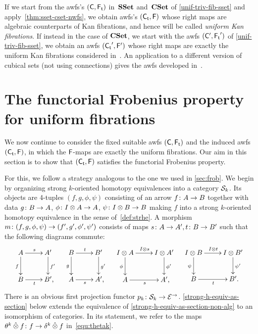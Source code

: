 \documentclass[reqno,10pt,a4paper,oneside,draft]{amsart}
\begin{document}
{{\begin{example} \label{unif-fib-sset}
If we start from the awfs's $(\CC, \TF)$ in~$\SSet$ and~$\CSet$ of \cref{unif-triv-fib-sset} and apply~\cref{thm:sset-cset-nwfs}, we obtain awfs's $(\TC, \FF)$ whose right maps are algebraic counterparts of Kan fibrations, and hence will be called \emph{uniform Kan fibrations}.
If instead in the case of $\CSet$, we start with the awfs $(\CC', \TF')$ of \cref{unif-triv-fib-sset}, we obtain an awfs $(\TC', \FF')$ whose right maps are exactly the uniform Kan fibrations considered in~\cite{cohen-et-al:cubicaltt}.
An application to a different version of cubical sets (not using connections) gives the awfs developed in~\cite{swan-awfs}.
\end{example}

\section{The functorial Frobenius property for uniform fibrations}
\label{sec:alg-frob}

We now continue to consider the fixed suitable awfs $(\CC, \TF)$ and the induced awfs $(\TC, \FF)$, in which the $\FF$-maps are exactly the uniform fibrations.
Our aim in this section is to show that $(\TC, \FF)$ satisfies the functorial Frobenius property.

For this, we follow a strategy analogous to the one we used in \cref{sec:frob}.
We begin by organizing strong $k$-oriented homotopy equivalences into a category $\cal{S}_k$.
Its objects are 4-tuples $(f, g, \phi, \psi)$ consisting of an arrow $f \co A \to B$ together with data $g \co B \to A$, $\phi \co \interval \otimes A \to A$, $\psi \co \interval \otimes B \to B$ making $f$ into a strong $k$-oriented homotopy equivalence in the sense of~\cref{def:strhe}.
A morphism $m \co (f, g, \phi, \psi) \to (f', g', \phi', \psi')$ consists of maps $s \co A \to A', t \co B \to B'$ such that the following diagrams commute:
\begin{align*}
\xymatrix{
  A
  \ar[r]^{s}
  \ar[d]_{f}
&
  A'
  \ar[d]^{f'}
\\
  B
  \ar[r]_{t}
&
  B'
\rlap{,}}
&&
\xymatrix{
  B
  \ar[r]^{t}
  \ar[d]_{g}
&
  B'
  \ar[d]^{g'}
\\
  A
  \ar[r]_{s}
&
  A'
\rlap{,}}
&&
\xymatrix{
  \interval \otimes A
  \ar[d]_{\phi}
  \ar[r]^{\interval \otimes s}
&
  I \otimes A'
  \ar[d]^{\phi'}
\\
  A
  \ar[r]_{s}
&
  A'
\rlap{,}}
&&
\xymatrix{
  \interval \otimes B
  \ar[d]_{\psi}
  \ar[r]^{\interval \otimes t}
&
  I \otimes B'
  \ar[d]^{\psi'}
\\
  B
  \ar[r]_{t}
&
  B'
\rlap{.}}
\end{align*}
There is an obvious first projection functor $p_k \co \cal{S}_k \to \catE^\to$.
\cref{strong-h-equiv-as-section} below extends the equivalence of \cref{strong-h-equiv-as-section-non-alg} to an isomorphism of categories.
In its statement, we refer to the maps~$\thetak \hatotimes f \co f \to \kcyl \hatotimes f$ in~\eqref{equ:thetak}.

}}
\end{document}
